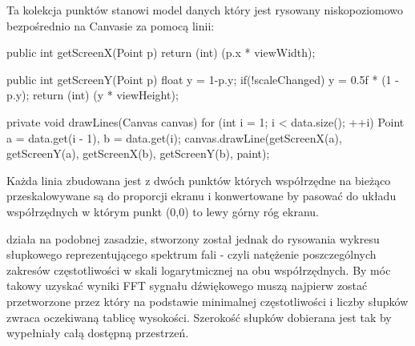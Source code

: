 Ta kolekcja punktów stanowi model danych który jest rysowany niskopoziomowo bezpośrednio na Canvasie za pomocą linii:
\begin{java}
    public int getScreenX(Point p) {
        return (int) (p.x * viewWidth);
    }
   
    public int getScreenY(Point p){
        float y = 1-p.y;
        if(!scaleChanged)
            y = 0.5f * (1 - p.y);
        return (int) (y * viewHeight);
    }

    private void drawLines(Canvas canvas) {
        for (int i = 1; i < data.size(); ++i) {
            Point a = data.get(i - 1), b = data.get(i);
            canvas.drawLine(getScreenX(a), getScreenY(a), getScreenX(b), getScreenY(b), paint);
        }
    }
\end{java}
Każda linia zbudowana jest z dwóch punktów których współrzędne na bieżąco przeskalowywane są do proporcji ekranu i konwertowane by pasować do układu współrzędnych w którym punkt (0,0) to lewy górny róg ekranu.

 działa na podobnej zasadzie, stworzony został jednak do rysowania wykresu słupkowego reprezentującego spektrum fali - czyli natężenie poszczególnych zakresów częstotliwości w skali logarytmicznej na obu współrzędnych. By móc takowy uzyskać wyniki FFT sygnału dźwiękowego muszą najpierw zostać przetworzone przez  który na podstawie minimalnej częstotliwości i liczby słupków zwraca oczekiwaną tablicę wysokości. Szerokość słupków dobierana jest tak by wypełniały całą dostępną przestrzeń.

